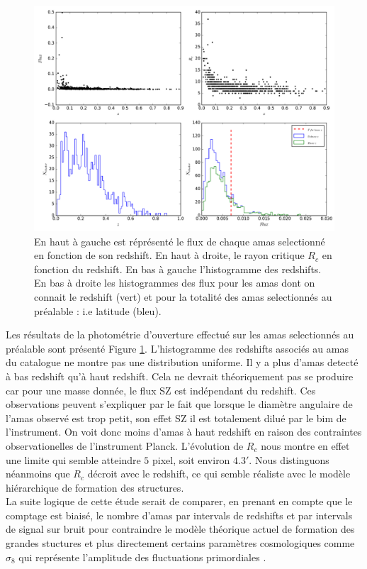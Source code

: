 \documentclass[a4paper,11pt]{article}
\begin{document}
\begin{figure}[h!]
  \centering
  \label{rslt_1}
  \includegraphics[scale = 0.4]{rslt_1.pdf}
  \caption{En haut à gauche est réprésenté le flux de chaque amas
    selectionné en fonction de son redshift. En haut à droite, le rayon critique
    $R_c$ en fonction du redshift. En bas à gauche l'histogramme des
    redshifts. En bas à droite les histogrammes des flux pour les amas
    dont on connait le redshift (vert) et pour la totalité des amas
    selectionnés au préalable : i.e latitude (bleu).}
\end{figure}

Les résultats de la photométrie d'ouverture effectué sur les amas
selectionnés au préalable sont présenté Figure
\ref{rslt_1}. L'histogramme des redshifts associés au amas du
catalogue ne montre pas une distribution uniforme. Il y a plus
d'amas detecté à bas redshift qu'à haut redshift. Cela ne devrait
théoriquement pas se produire car pour une masse donnée, le flux SZ
est indépendant du redshift. Ces observations peuvent s'expliquer par
le fait que lorsque le diamètre angulaire de l'amas observé est trop
petit, son effet SZ il est totalement dilué par le bim de
l'instrument. On voit donc moins d'amas à haut redshift en raison des
contraintes observationelles de l'instrument Planck. L'évolution de
$R_c$ nous montre en effet une limite qui semble atteindre $5$ pixel,
soit environ $4.3'$. Nous distinguons néanmoins que $R_c$ décroit avec
le redshift, ce qui semble réaliste avec le modèle hiérarchique de
formation des structures. \\

La suite logique de cette étude serait de comparer, en prenant en
compte que le comptage est biaisé, le nombre d'amas par intervals de
redshifts  et par intervals de signal sur bruit pour contraindre le modèle
théorique actuel de formation des grandes stuctures et plus
directement certains paramètres cosmologiques comme $\sigma_8$ qui
représente l'amplitude des fluctuations primordiales
. \\
\end{document}
